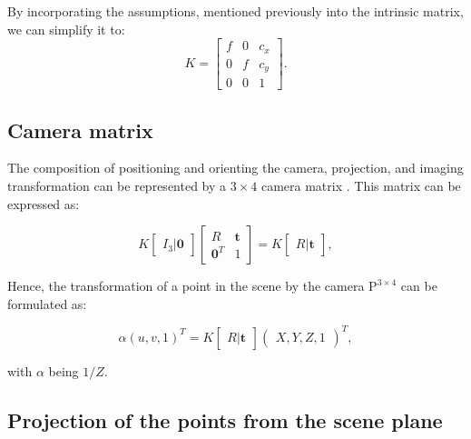 By incorporating the assumptions, mentioned previously into the intrinsic matrix,
we can simplify it to:
\begin{equation}
	K = \begin{bmatrix}
		f & 0 & c_x \\
		0 & f & c_y \\
		0 & 0 & 1
	\end{bmatrix}.
\end{equation}

\subsection{Camera matrix}\label{sub:camera_matrix}

The composition of positioning and orienting the camera, projection, and
imaging transformation can be represented by a $3 \times 4$ camera
matrix \citep{scaramuzzaFlexibleTechniqueAccurate2006}. This matrix can be expressed as:

\begin{equation}
	K \begin{bmatrix}
		I_3 \vert \mathbf{0}
	\end{bmatrix} \begin{bmatrix}
		R              & \mathbf{t} \\
		\mathbf{0}^{T} & 1
	\end{bmatrix} = K \begin{bmatrix}
		R \vert \mathbf{t}
	\end{bmatrix},
\end{equation}

Hence, the transformation of a point in the scene by the camera $\mathrm{P}^{3 \times 4}$ can be formulated as:

\begin{equation}
	\alpha(u, v, 1)^{T} = K \begin{bmatrix}
		R \vert \mathbf{t}
	\end{bmatrix} \begin{pmatrix}
		X, Y, Z, 1
	\end{pmatrix}^{T},
\end{equation}

with $\alpha$ being $1 / Z$.

\subsection{Projection of the points from the scene plane}\label{sub:projection_of_the_points_from_the_scene_plane}

